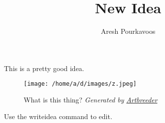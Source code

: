 \documentclass{article}
\begin{document}
\title{New Idea}
\author{Aresh Pourkavoos}
\maketitle

This is a pretty good idea.
\begin{figure}[H]
  \centering
  \texttt{[image: /home/a/d/images/z.jpeg]}
  \caption*{What is this thing? \textit{Generated by \href{https://artbreeder.com}{Artbreeder}}}
\end{figure}
Use the writeidea command to edit.
\end{document}
